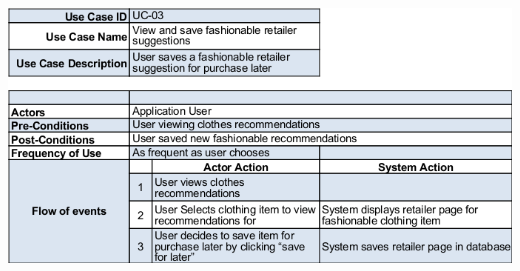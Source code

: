 \documentclass[12pt,a4paper]{article}
\begin{document}
\includegraphics[scale=0.7]{usecase3.png} \\\\


\end{document}
